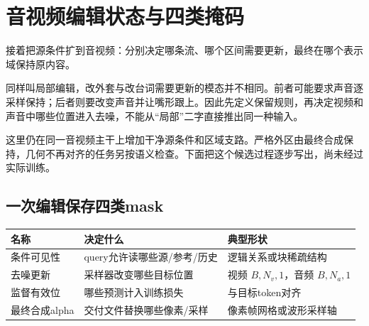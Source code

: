 \chapter{音视频编辑状态与四类掩码}\label{seedance-m23}

接着把源条件扩到音视频：分别决定哪条流、哪个区间需要更新，最终在哪个表示域保持原内容。

同样叫局部编辑，改外套与改台词需要更新的模态并不相同。前者可能要求声音逐采样保持；后者则要改变声音并让嘴形跟上。因此先定义保留规则，再决定视频和声音中哪些位置进入去噪，不能从“局部”二字直接推出同一种输入。

这里仍在同一音视频主干上增加干净源条件和区域支路。严格外区由最终合成保持，几何不再对齐的任务另按语义检查。下面把这个候选过程逐步写出，尚未经过实际训练。

\section{一次编辑保存四类mask}\label{seedance-m23-ux4e00ux6b21ux7f16ux8f91ux4fddux5b58ux56dbux7c7bmask}

{\def\LTcaptype{table} %
\small\setlength{\tabcolsep}{3pt}\renewcommand{\arraystretch}{1.18}
\begin{longtable}[]{@{}
  >{\raggedright\arraybackslash}p{}
  >{\raggedright\arraybackslash}p{}
  >{\raggedright\arraybackslash}p{}@{}}
\toprule\noalign{}
\begin{minipage}[b]{\linewidth}\raggedright
名称
\end{minipage} & \begin{minipage}[b]{\linewidth}\raggedright
决定什么
\end{minipage} & \begin{minipage}[b]{\linewidth}\raggedright
典型形状
\end{minipage} \\
\midrule\noalign{}
\endhead
\bottomrule\noalign{}
\endlastfoot
条件可见性 & query允许读哪些源/参考/历史 & 逻辑关系或块稀疏结构 \\
去噪更新 & 采样器改变哪些目标位置 & 视频 \(B,N_v,1\)，音频 \(B,N_a,1\) \\
监督有效位 & 哪些预测计入训练损失 & 与目标token对齐 \\
最终合成alpha & 交付文件替换哪些像素/采样 & 像素帧网格或波形采样轴 \\
\end{longtable}
}

